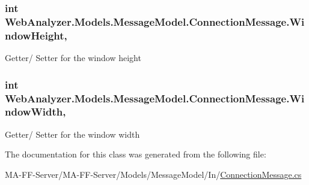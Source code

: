 \subsubsection[{Window\+Height}]{\setlength{\rightskip}{0pt plus 5cm}int Web\+Analyzer.\+Models.\+Message\+Model.\+Connection\+Message.\+Window\+Height\hspace{0.3cm}{\ttfamily [get]}, {\ttfamily [set]}}\label{class_web_analyzer_1_1_models_1_1_message_model_1_1_connection_message_a945ce5486695eaed31e71e0e11e0dc64}


Getter/ Setter for the window height 

\hypertarget{class_web_analyzer_1_1_models_1_1_message_model_1_1_connection_message_ad41b2edd499a0085aefa4ab180de9dc7}{}
\subsubsection[{Window\+Width}]{\setlength{\rightskip}{0pt plus 5cm}int Web\+Analyzer.\+Models.\+Message\+Model.\+Connection\+Message.\+Window\+Width\hspace{0.3cm}{\ttfamily [get]}, {\ttfamily [set]}}\label{class_web_analyzer_1_1_models_1_1_message_model_1_1_connection_message_ad41b2edd499a0085aefa4ab180de9dc7}


Getter/ Setter for the window width 



The documentation for this class was generated from the following file\+:\begin{DoxyCompactItemize}
\item 
M\+A-\/\+F\+F-\/\+Server/\+M\+A-\/\+F\+F-\/\+Server/\+Models/\+Message\+Model/\+In/\hyperlink{_connection_message_8cs}{Connection\+Message.\+cs}\end{DoxyCompactItemize}
